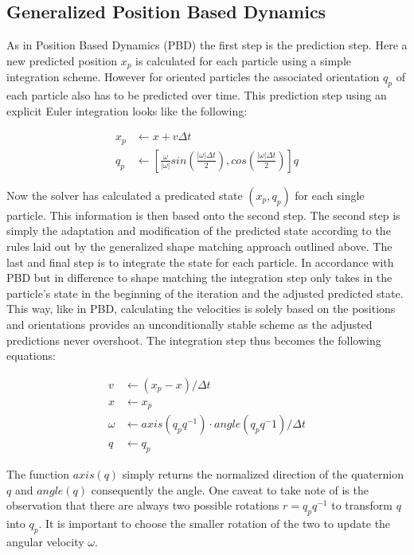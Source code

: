 \subsection{Generalized Position Based Dynamics}
As in Position Based Dynamics (PBD) the first step is the prediction step. Here a new predicted position $x_p$ is calculated for each particle using a simple integration scheme. However for oriented particles the associated orientation $q_p$ of each particle also has to be predicted over time. This prediction step using an explicit Euler integration looks like the following:

\begin{align}
x_p &\leftarrow x + v\Delta t \\
q_p &\leftarrow [\frac{\omega}{|\omega|}sin(\frac{|\omega|\Delta t}{2}), cos(\frac{|\omega|\Delta t}{2})]q
\end{align}

Now the solver has calculated a predicated state $(x_p,q_p)$ for each single particle. This information is then based onto the second step. The second step is simply the adaptation and modification of the predicted state according to the rules laid out by the generalized shape matching approach outlined above. The last and final step is to integrate the state for each particle. In accordance with PBD but in difference to shape matching the integration step only takes in the particle's state in the beginning of the iteration and the adjusted predicted state. This way, like in PBD, calculating the velocities is solely based on the positions and orientations provides an unconditionally stable scheme as the adjusted predictions never overshoot. The integration step thus becomes the following equations:

\begin{align}
v &\leftarrow (x_p - x)/\Delta t \\
x &\leftarrow x_p \\
\omega &\leftarrow axis(q_p q^{-1}) \cdot angle(q_p q^-1)/\Delta t \\
q &\leftarrow q_p
\end{align}

The function $axis(q)$ simply returns the normalized direction of the quaternion $q$ and $angle(q)$ consequently the angle. One caveat to take note of is the observation that there are always two possible rotations $r=q_pq^{-1}$ to transform $q$ into $q_p$. It is important to choose the smaller rotation of the two to update the angular velocity $\omega$.

